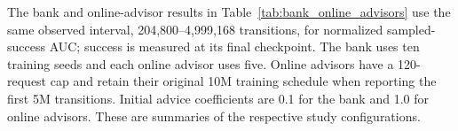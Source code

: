 The bank and online-advisor results in Table~\ref{tab:bank_online_advisors}
use the same observed interval, 204,800--4,999,168 transitions, for
normalized sampled-success AUC; success is measured at its final checkpoint.
The bank uses ten training seeds and each online advisor uses five.
Online advisors have a 120-request cap and retain their original
10M training schedule when reporting the first 5M transitions.
Initial advice coefficients are 0.1 for the bank and 1.0 for online
advisors. These are summaries of the respective study configurations.

